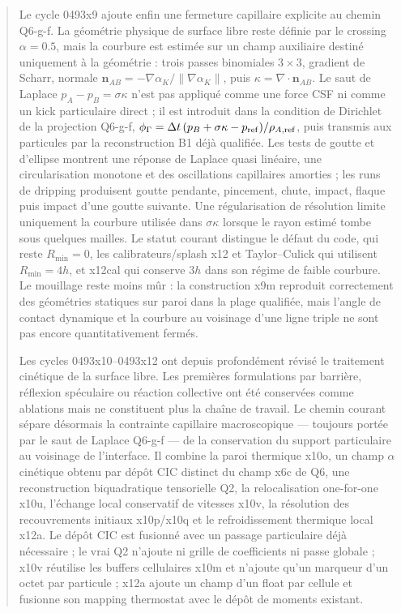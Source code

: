 \documentclass[11pt,a4paper]{article}
\begin{document}
\begin{abstract}
Le cycle 0493x9 ajoute enfin une fermeture capillaire explicite au chemin Q6-g-f. La géométrie physique de surface libre reste définie par le crossing $\alpha=0.5$, mais la courbure est estimée sur un champ auxiliaire destiné uniquement à la géométrie : trois passes binomiales $3\times3$, gradient de Scharr, normale $\bm n_{AB}=-\nabla\alpha_K/\lVert\nabla\alpha_K\rVert$, puis $\kappa=\nabla\cdot\bm n_{AB}$. Le saut de Laplace $p_A-p_B=\sigma\kappa$ n'est pas appliqué comme une force CSF ni comme un kick particulaire direct ; il est introduit dans la condition de Dirichlet de la projection Q6-g-f, $\phi_\Gamma=\Delta t\,(p_B+\sigma\kappa-p_{\rm ref})/\rho_{A,\rm ref}$, puis transmis aux particules par la reconstruction B1 déjà qualifiée. Les tests de goutte et d'ellipse montrent une réponse de Laplace quasi linéaire, une circularisation monotone et des oscillations capillaires amorties ; les runs de dripping produisent goutte pendante, pincement, chute, impact, flaque puis impact d'une goutte suivante. Une régularisation de résolution limite uniquement la courbure utilisée dans $\sigma\kappa$ lorsque le rayon estimé tombe sous quelques mailles. Le statut courant distingue le défaut du code, qui reste $R_{\min}=0$, les calibrateurs/splash x12 et Taylor--Culick qui utilisent $R_{\min}=4h$, et x12cal qui conserve $3h$ dans son régime de faible courbure. Le mouillage reste moins mûr : la construction x9m reproduit correctement des géométries statiques sur paroi dans la plage qualifiée, mais l'angle de contact dynamique et la courbure au voisinage d'une ligne triple ne sont pas encore quantitativement fermés.

Les cycles 0493x10--0493x12 ont depuis profondément révisé le traitement cinétique de la surface libre. Les premières formulations par barrière, réflexion spéculaire ou réaction collective ont été conservées comme ablations mais ne constituent plus la chaîne de travail. Le chemin courant sépare désormais la contrainte capillaire macroscopique --- toujours portée par le saut de Laplace Q6-g-f --- de la conservation du support particulaire au voisinage de l'interface. Il combine la paroi thermique x10o, un champ $\alpha$ cinétique obtenu par dépôt CIC distinct du champ x6c de Q6, une reconstruction biquadratique tensorielle Q2, la relocalisation one-for-one x10u, l'échange local conservatif de vitesses x10v, la résolution des recouvrements initiaux x10p/x10q et le refroidissement thermique local x12a. Le dépôt CIC est fusionné avec un passage particulaire déjà nécessaire ; le vrai Q2 n'ajoute ni grille de coefficients ni passe globale ; x10v réutilise les buffers cellulaires x10m et n'ajoute qu'un marqueur d'un octet par particule ; x12a ajoute un champ d'un float par cellule et fusionne son mapping thermostat avec le dépôt de moments existant.


\end{abstract}
\end{document}
